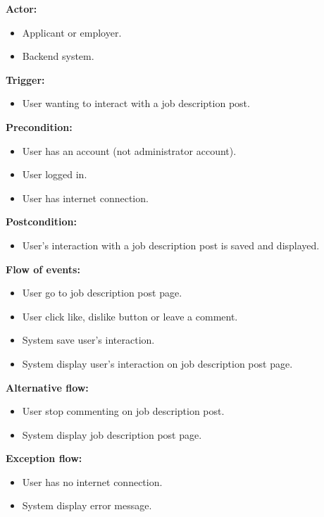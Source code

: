 \documentclass[a4paper]{article}
\begin{document}
        \textbf{Actor:}
        \begin{itemize}
            \item Applicant or employer.
            \item Backend system.
        \end{itemize}

        \textbf{Trigger:}
        \begin{itemize}
            \item User wanting to interact with a job description post.
        \end{itemize}

        \textbf{Precondition:}
        \begin{itemize}
            \item User has an account (not administrator account).
            \item User logged in.
            \item User has internet connection.
        \end{itemize}

        \textbf{Postcondition:}
        \begin{itemize}
            \item User's interaction with a job description post is saved and displayed.
        \end{itemize}

        \textbf{Flow of events:}
        \begin{itemize}
            \item User go to job description post page.
            \item User click like, dislike button or leave a comment.
            \item System save user's interaction.
            \item System display user's interaction on job description post page.
        \end{itemize}

        \textbf{Alternative flow:}
        \begin{itemize}
            \item User stop commenting on job description post.
            \item System display job description post page.
        \end{itemize}

        \textbf{Exception flow:}
        \begin{itemize}
            \item User has no internet connection.
            \item System display error message.
        \end{itemize}
\end{document}
